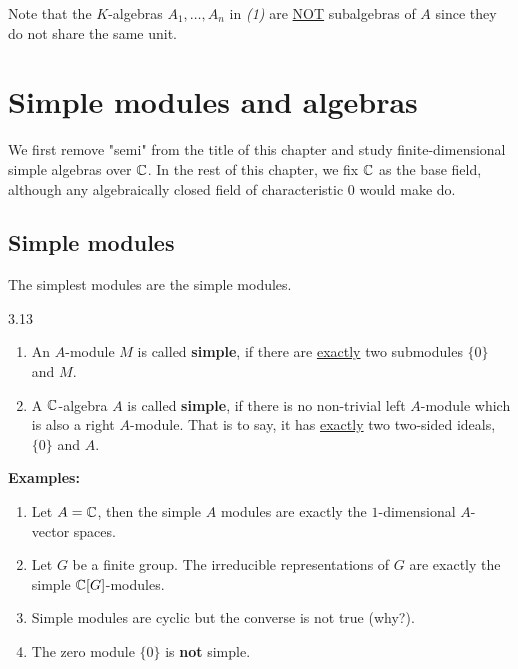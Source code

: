 \documentclass[twoside = false,	%
		headsepline,		%
		parskip = true,
		]{scrbook}						%
\begin{document}
    Note that the $K$-algebras $A_1,\dots, A_n$ in \textit{(1)} are \underline{NOT} subalgebras of $A$ since they do not share the same unit.

\section{Simple modules and algebras}
    We first remove "semi" from the title of this chapter and study finite-dimensional simple algebras over $\mathbb C$. In the rest of this chapter, we fix $\mathbb C$ as the base field, although any algebraically closed field of characteristic $0$ would make do.
    
\subsection{Simple modules}
    The simplest modules are the simple modules.

    \begin{definition}{}{3.13}
        \begin{enumerate}
            \item An $A$-module $M$ is called \textbf{simple}, if there are \underline{exactly} two submodules $\{0\}$ and $M$.
            \item A $\mathbb C$-algebra $A$ is called \textbf{simple}, if there is no non-trivial left $A$-module which is also a right $A$-module. That is to say, it has \underline{exactly} two two-sided ideals, $\{0\}$ and $A$.
        \end{enumerate}
    \end{definition}

    \textbf{Examples:}
    \begin{enumerate}
        \item Let $A = \mathbb C$, then the simple $A$ modules are exactly the $1$-dimensional $A$-vector spaces.
        \item Let $G$ be a finite group. The irreducible representations of $G$ are exactly the simple $\mathbb C[G]$-modules.
        \item Simple modules are cyclic but the converse is not true (why?).
        \item The zero module $\{0\}$ is \textbf{not} simple.
    \end{enumerate}
\end{document}
